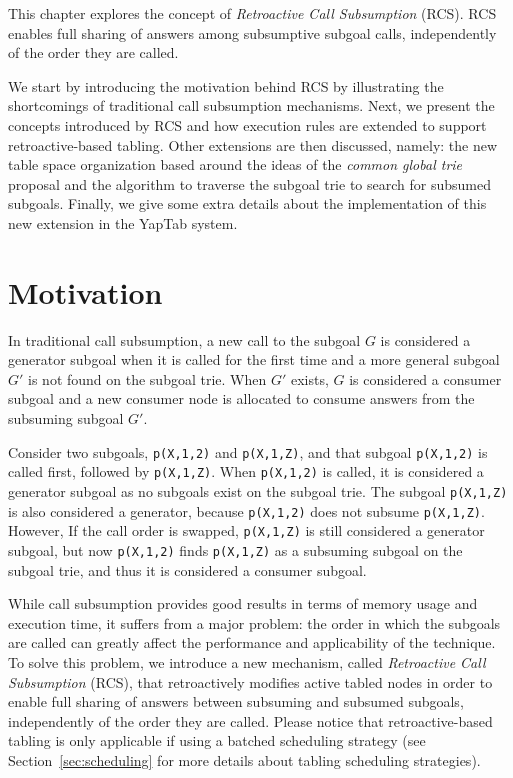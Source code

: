 This chapter explores the concept of \emph{Retroactive Call Subsumption} (RCS). RCS
enables full sharing of answers among subsumptive subgoal calls, independently of the order they are called.

We start by introducing the motivation behind RCS by illustrating the shortcomings of traditional call
subsumption mechanisms. Next, we present the concepts introduced by RCS and how execution
rules are extended to support retroactive-based tabling. Other extensions are then discussed, namely:
the new table space organization based around the ideas of the \textit{common global trie} proposal
\cite{CostaJ-08} and the algorithm to traverse the subgoal trie to search for subsumed subgoals. Finally, we
give some extra details about the implementation of this new extension in the YapTab system.

\section{Motivation}

In traditional call subsumption, a new call to the subgoal $G$ is considered a generator subgoal
when it is called for the first time and a more general subgoal $G'$ is not found on the subgoal trie.
When $G'$ exists, $G$ is considered a consumer subgoal and a new consumer node is allocated to consume
answers from the subsuming subgoal $G'$.

Consider two subgoals, \texttt{p(X,1,2)} and \texttt{p(X,1,Z)}, and that subgoal \texttt{p(X,1,2)} is called first,
followed by \texttt{p(X,1,Z)}. When \texttt{p(X,1,2)} is called, it is considered a generator subgoal as no subgoals
exist on the subgoal trie. The subgoal \texttt{p(X,1,Z)} is also considered a generator, because
\texttt{p(X,1,2)} does not subsume \texttt{p(X,1,Z)}. However, If the call order is swapped, \texttt{p(X,1,Z)} is still
considered a generator subgoal, but now \texttt{p(X,1,2)} finds \texttt{p(X,1,Z)} as a subsuming subgoal
on the subgoal trie, and thus it is considered a consumer subgoal.

While call subsumption provides good results in terms of memory usage and execution time, it suffers from a
major problem: the order in which the subgoals are called can greatly affect the performance
and applicability of the technique. To solve this problem, we introduce a new mechanism, called \textit{Retroactive Call
Subsumption} (RCS), that retroactively modifies active tabled nodes in order to enable full sharing
of answers between subsuming and subsumed subgoals, independently of the order they are called.
Please notice that retroactive-based tabling is only applicable if using a batched scheduling strategy
(see Section~\ref{sec:scheduling} for more details about tabling scheduling strategies).

